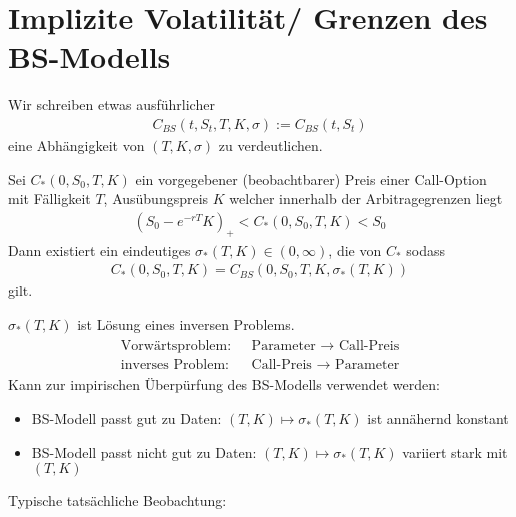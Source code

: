 \section{Implizite Volatilität/ Grenzen des BS-Modells}
Wir schreiben etwas ausführlicher
\begin{align*}
	C_{BS}(t,S_t, T, K, \sigma) := C_{BS}(t, S_t)
\end{align*}
eine Abhängigkeit von $(T,K,\sigma)$ zu verdeutlichen.
\begin{theorem} %
	Sei $C_{\ast}(0,S_0,T, K)$ ein vorgegebener (beobachtbarer) Preis einer Call-Option mit Fälligkeit $T$, Ausübungspreis $K$ welcher innerhalb der Arbitragegrenzen liegt
	\begin{align*}
		(S_0 - e^{-rT}K)_+ < C_{\ast}(0,S_0, T,K) < S_0
	\end{align*}
	Dann existiert ein eindeutiges $\sigma_{\ast}(T, K) \in (0,\infty)$, die  von $C_{\ast}$ sodass
	\begin{align*}
		C_{\ast}(0,S_0, T,K) = C_{BS}(0,S_0,T,K, \sigma_{\ast}(T,K))
	\end{align*}
	gilt.
\end{theorem}
\begin{*remark}
	$\sigma_{\ast}(T,K)$ ist Lösung eines inversen Problems.
	\begin{align*}
		\begin{matrix}
			\text{Vorwärtsproblem: } & \text{ Parameter }\to \text{ Call-Preis}\\
			\text{inverses Problem: } & \text{ Call-Preis }\to \text{ Parameter}
		\end{matrix}
	\end{align*}
	Kann zur impirischen Überpürfung des BS-Modells verwendet werden:
	\begin{itemize}
		\item BS-Modell passt gut zu Daten: $(T,K) \mapsto \sigma_{\ast}(T,K)$ ist annähernd konstant
		\item BS-Modell passt nicht gut zu Daten: $(T,K) \mapsto \sigma_{\ast}(T,K)$ variiert stark mit $(T,K)$
	\end{itemize}
\end{*remark}
Typische tatsächliche Beobachtung:\\

